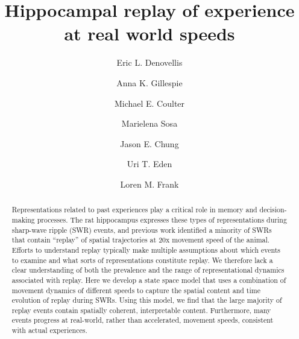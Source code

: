 \documentclass[9pt,lineno]{elife}
\begin{document}
\title{Hippocampal replay of experience at real world speeds}

\author[1, 2, 3]{Eric L. Denovellis}
\author[2, 3]{Anna K. Gillespie}
\author[2, 3]{Michael E. Coulter}
\author[4]{Marielena Sosa}
\author[5]{Jason E. Chung}
\author[6]{Uri T. Eden}
\author[1, 2, 3]{Loren M. Frank}



\maketitle

\begin{abstract}
Representations related to past experiences play a critical role in memory and decision-making processes. The rat hippocampus expresses these types of representations during sharp-wave ripple (SWR) events, and previous work identified a minority of SWRs that contain “replay” of spatial trajectories at \texttildelow20x movement speed of the animal. Efforts to understand replay typically make multiple assumptions about which events to examine and what sorts of representations constitute replay. We therefore lack a clear understanding of both the prevalence and the range of representational dynamics associated with replay. Here we develop a state space model that uses a combination of movement dynamics of different speeds to capture the spatial content and time evolution of replay during SWRs. Using this model, we find that the large majority of replay events contain spatially coherent, interpretable content. Furthermore, many events progress at real-world, rather than accelerated, movement speeds, consistent with actual experiences. 
\end {abstract}
\end{document}

